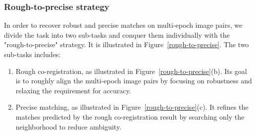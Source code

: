\subsubsection{Rough-to-precise strategy}
In order to recover robust and precise matches on multi-epoch image pairs, we divide the task into two sub-tasks and conquer them individually with the "rough-to-precise" strategy. It is illustrated in Figure~\ref{rough-to-precise}. The two sub-tasks includes:\\
\begin{enumerate}
	\item Rough co-registration, as illustrated in Figure~\ref{rough-to-precise}(b). Its goal is to roughly align the multi-epoch image pairs by focusing on robustness and relaxing the requirement for accuracy.
	\item Precise matching, as illustrated in Figure~\ref{rough-to-precise}(c). It refines the matches predicted by the rough co-registration result by searching only the neighborhood to reduce ambiguity.
\end{enumerate}
